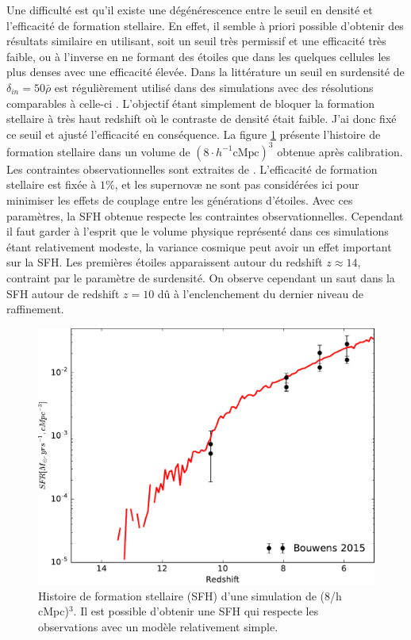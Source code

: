 Une difficulté est qu'il existe une dégénérescence entre le seuil en densité et l'efficacité de formation stellaire.
En effet, il semble à priori possible d'obtenir des résultats similaire en utilisant, soit un seuil très permissif et une efficacité très faible, ou à l'inverse en ne formant des étoiles que dans les quelques cellules les plus denses avec une efficacité élevée.
Dans la littérature un seuil en surdensité de $\delta_{in}=50\bar{\rho}$ est régulièrement utilisé dans des simulations avec des résolutions comparables à celle-ci \citep{ocvirk_cosmic_2015,stinson_star_2006}.
L'objectif étant simplement de bloquer la formation stellaire à très haut redshift où le contraste de densité était faible.
J'ai donc fixé ce seuil et ajusté l'efficacité en conséquence.
La figure \ref{fig:test_SFH} présente l'histoire de formation stellaire dans un volume de $\left( 8\cdot h^{-1} \mathrm{cMpc} \right)^3$ obtenue après calibration. 
Les contraintes observationnelles sont extraites de \cite{bouwens_reionization_2015}.
L'efficacité de formation stellaire est fixée à $1\%$, et les supernovæ ne sont pas considérées ici pour minimiser les effets de couplage entre les générations d'étoiles.
Avec ces paramètres, la \ac{SFH} obtenue respecte les contraintes observationnelles.
Cependant il faut garder à l'esprit que le volume physique représenté dans ces simulations étant relativement modeste, la variance cosmique peut avoir un effet important sur la \ac{SFH}.
Les premières étoiles apparaissent autour du redshift $z\approx 14$, contraint par le paramètre de surdensité.
On observe cependant un saut dans la \ac{SFH} autour de redshift $z=10$ dû à l'enclenchement du dernier niveau de raffinement.

\begin{figure}
        \includegraphics[width=.95\linewidth]{img/02/SFR.pdf}
        \caption[Histoire de formation stellaire]{Histoire de formation stellaire (SFH) d'une simulation de (8/h cMpc)$^3$.
        Il est possible d'obtenir une SFH qui respecte les observations avec un modèle relativement simple.
}
 		\label{fig:test_SFH}
\end{figure}

